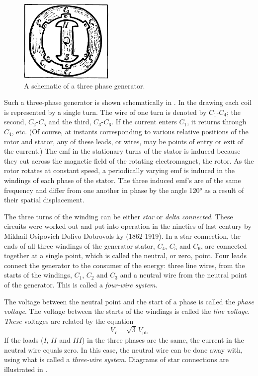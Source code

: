 \begin{figure}[!ht]
\centering
\includegraphics[width=0.4\textwidth]{figures/fig-04-06.pdf}
\caption{A schematic of a three phase generator.}
\label{fig-4.6}
\end{figure}

Such a three-phase generator is shown schematically in . In the drawing each coil is represented by a single turn. The wire of one turn is denoted by $C_{1}$-$C_{4}$; the second, $C_{2}$-$C_{5}$ and the third, $C_{3}$-$C_{6}$. If the current enters $C_{1}$, it returns through $C_{4}$, etc. (Of course, at instants corresponding to various relative positions of the rotor and stator, any of these leads, or wires, may be points of entry or exit of the current.) The emf in the stationary turns of the stator is induced because they cut across the magnetic field of the rotating electromagnet, the rotor. As the rotor rotates at constant speed, a periodically varying emf is induced in the windings of each phase of the stator. The three induced emf's are of the same frequency and differ from one another in phase by the angle \ang{120} as a result of their spatial displacement. 

The three turns of the winding can be either \emph{star} or \emph{delta connected}. These circuits were worked out and put into operation in the nineties of last century by Mikhail Osipovich Dolivo-Dobrovols-ky (1862-1919). In a star connection, the ends of all three windings of the generator stator, $C_{4}$, $C_{5}$ and $C_{6}$, are connected together at a single point, which is called the neutral, or zero, point. Four leads connect the generator to the consumer of the energy: three line wires, from the starts of the windings, $C_{1}$, $C_{2}$ and $C_{3}$ and a neutral wire from the neutral point of the generator. This is called a \emph{four-wire system}.

The voltage between the neutral point and the start of a phase is called the \emph{phase voltage}. The voltage between the starts of the windings is called the \emph{line voltage. These} voltages are related by the equation
\begin{equation*}%
V_{I} = \sqrt{3} \, V_{\textrm{ph}}
\end{equation*}
If the loads ($I$, $II$ and $III$) in the three phases are the same, the current in the neutral wire equals zero. In this case, the neutral wire can be done away with, using what is called a \emph{three-wire system}. Diagrams of star connections are illustrated in .


